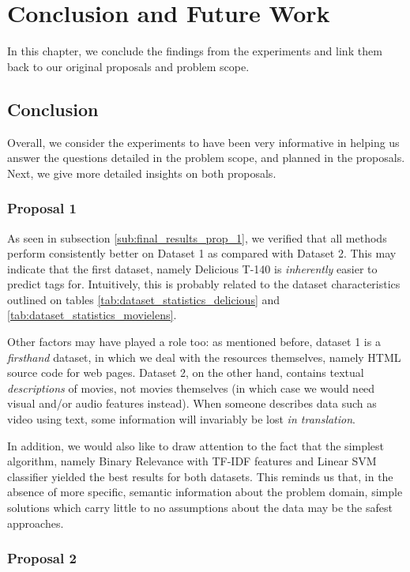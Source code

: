 \chapter{Conclusion and Future Work}\label{chap: conclusion}

In this chapter, we conclude the findings from the experiments and link them back to our original proposals and problem scope.

\section{Conclusion}

Overall, we consider the experiments to have been very informative in helping us answer the questions detailed in the problem scope, and planned in the proposals. Next, we give more detailed insights on both proposals.

\subsection{Proposal 1}

As seen in subsection \ref{sub:final_results_prop_1}, we verified that all methods perform consistently better on Dataset 1 as compared with Dataset 2. This may indicate that the first dataset, namely Delicious T-140 is \textit{inherently} easier to predict tags for. Intuitively, this is probably related to the dataset characteristics outlined on tables \ref{tab:dataset_statistics_delicious} and \ref{tab:dataset_statistics_movielens}.

Other factors may have played a role too: as mentioned before, dataset 1 is a \textit{firsthand} dataset, in which we deal with the resources themselves, namely HTML source code for web pages. Dataset 2, on the other hand, contains textual \textit{descriptions} of movies, not movies themselves (in which case we would need visual and/or audio features instead). When someone describes data such as video using text, some information will invariably be lost \textit{in translation}.

In addition, we would also like to draw attention to the fact that the simplest algorithm, namely Binary Relevance with TF-IDF features and Linear SVM classifier yielded the best results for both datasets. This reminds us that, in the absence of more specific, semantic information about the problem domain, simple solutions which carry little to no assumptions about the data may be the safest approaches.

\subsection{Proposal 2}

